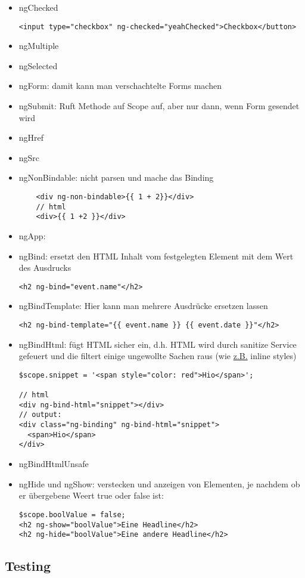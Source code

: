 \begin{itemize}
  \item ngChecked
    \begin{verbatim}
<input type="checkbox" ng-checked="yeahChecked">Checkbox</button>
    \end{verbatim}
  \item ngMultiple
  \item ngSelected
  \item ngForm: damit kann man verschachtelte Forms machen
  \item ngSubmit: Ruft Methode auf Scope auf, aber nur dann, wenn Form gesendet wird
  \item ngHref
  \item ngSrc
  \item ngNonBindable: nicht parsen und mache das Binding
    \begin{verbatim}
    <div ng-non-bindable>{{ 1 + 2}}</div>
    // html
    <div>{{ 1 +2 }}</div>
    \end{verbatim}
\end{itemize}


\begin{itemize}
  \item ngApp:
  \item ngBind: ersetzt den HTML Inhalt vom festgelegten Element mit dem Wert des Ausdrucks
    \begin{verbatim}
<h2 ng-bind="event.name"</h2>
    \end{verbatim}
  \item ngBindTemplate: Hier kann man mehrere Ausdrücke ersetzen lassen
    \begin{verbatim}
<h2 ng-bind-template="{{ event.name }} {{ event.date }}"</h2>
    \end{verbatim}
  \item ngBindHtml: fügt HTML sicher ein, d.h. HTML wird durch sanitize Service gefeuert und die
    filtert einige ungewollte Sachen raus (wie \uline{z.B.} inline styles)

    \begin{verbatim}
$scope.snippet = '<span style="color: red">Hio</span>';

// html
<div ng-bind-html="snippet"></div>
// output:
<div class="ng-binding" ng-bind-html="snippet">
  <span>Hio</span>
</div>
    \end{verbatim}
  \item ngBindHtmlUnsafe
  \item ngHide und ngShow: verstecken und anzeigen von Elementen, je nachdem ob er übergebene Weert
    true oder false ist:
    \begin{verbatim}
$scope.boolValue = false;
<h2 ng-show="boolValue">Eine Headline</h2>
<h2 ng-hide="boolValue">Eine andere Headline</h2>
    \end{verbatim}
\end{itemize}

\subsection{Testing}


